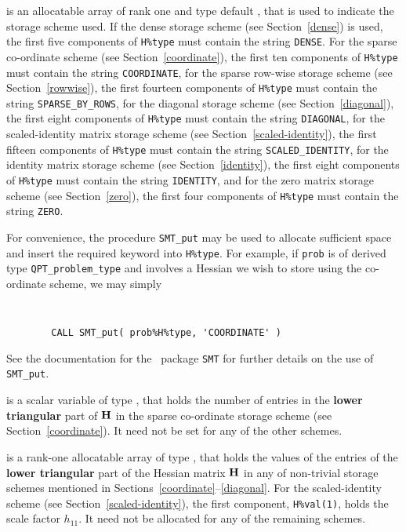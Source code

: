 \documentclass{galahad}
\newcommand{\packagename}{QPT}
\begin{document}
\begin{description}
\begin{description}

 is an allocatable array of rank one and type default \character, that
is used to indicate the storage scheme used. If the dense storage scheme
(see Section~\ref{dense}) is used,
the first five components of {\tt H\%type} must contain the
string {\tt DENSE}.
For the sparse co-ordinate scheme (see Section~\ref{coordinate}),
the first ten components of {\tt H\%type} must contain the
string {\tt COORDINATE},
for the sparse row-wise storage scheme (see Section~\ref{rowwise}),
the first fourteen components of {\tt H\%type} must contain the
string {\tt SPARSE\_BY\_ROWS},
for the diagonal storage scheme (see Section~\ref{diagonal}),
the first eight components of {\tt H\%type} must contain the
string {\tt DIAGONAL},
for the scaled-identity matrix storage scheme
(see Section~\ref{scaled-identity}),
the first fifteen components of {\tt H\%type} must contain the
string {\tt SCALED\_IDENTITY},
for the identity matrix storage scheme
(see Section~\ref{identity}),
the first eight components of {\tt H\%type} must contain the
string {\tt IDENTITY}, and
for the zero matrix storage scheme
(see Section~\ref{zero}),
the first four components of {\tt H\%type} must contain the
string {\tt ZERO}.

For convenience, the procedure {\tt SMT\_put}
may be used to allocate sufficient space and insert the required keyword
into {\tt H\%type}.
For example, if {\tt prob} is of derived type {\tt \packagename\_problem\_type}
and involves a Hessian we wish to store using the co-ordinate scheme,
we may simply
{\tt
\begin{verbatim}
        CALL SMT_put( prob%H%type, 'COORDINATE' )
\end{verbatim}
}
\noindent
See the documentation for the \galahad\ package {\tt SMT}
for further details on the use of {\tt SMT\_put}.

 is a scalar variable of type \integer, that
holds the number of entries in the {\bf lower triangular} part of ${\mathbf{H}}$
in the sparse co-ordinate storage scheme (see Section~\ref{coordinate}).
It need not be set for any of the other schemes.

 is a rank-one allocatable array of type \realdp, that holds
the values of the entries of the {\bf lower triangular} part
of the Hessian matrix ${\mathbf{H}}$ in any of non-trivial storage schemes
mentioned in Sections~\ref{coordinate}--\ref{diagonal}.
For the scaled-identity scheme (see Section~\ref{scaled-identity}),
the first component, {\tt H\%val(1)}, holds the scale factor $h_{11}$.
It need not be allocated for any of the remaining schemes.


\end{description}
\end{description}
\end{document}
